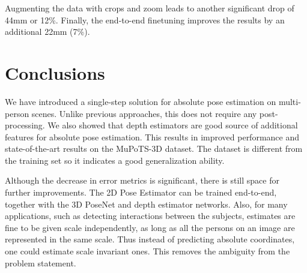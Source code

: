 \documentclass[conference]{IEEEtran}
\begin{document}
Augmenting the data with crops and zoom leads to another significant drop of 44mm or 12\%. Finally, the end-to-end finetuning improves the results by an additional 22mm (7\%).


\section{Conclusions}\label{sec:conc}
We have introduced a single-step solution for absolute pose estimation on multi-person scenes. Unlike previous approaches, this does not require any post-processing. We also showed that depth estimators are good source of additional features for absolute pose estimation. This results in improved performance and state-of-the-art results on the MuPoTS-3D dataset. The dataset is different from the training set so it indicates a good generalization ability. 

Although the decrease in error metrics is significant, there is still space for further improvements. The 2D Pose Estimator can be trained end-to-end, together with the 3D PoseNet and depth estimator networks. Also, for many applications, such as detecting interactions between the subjects, estimates are fine to be given scale independently, as long as all the persons on an image are represented in the same scale. Thus instead of predicting absolute coordinates, one could estimate scale invariant ones. This removes the ambiguity from the problem statement.



\end{document}
